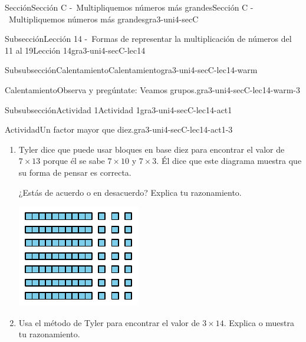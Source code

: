 \documentclass[twoside,10pt,]{article}
\begin{document}
\begin{sectionptx}{Sección}{Sección C -~Multipliquemos números más grandes}{}{Sección C -~Multipliquemos números más grandes}{}{}{gra3-uni4-secC}
\begin{subsectionptx}{Subsección}{Lección 14 -~Formas de representar la multiplicación de números del 11 al 19}{}{Lección 14}{}{}{gra3-uni4-secC-lec14}
\begin{subsubsectionptx}{Subsubsección}{Calentamiento}{}{Calentamiento}{}{}{gra3-uni4-secC-lec14-warm}
\begin{exploration}{Calentamiento}{Observa y pregúntate: Veamos grupos.}{gra3-uni4-secC-lec14-warm-3}
\begin{sidebyside}{3}{0}{0}{0}
\begin{sbspanel}{0.333333333333333}
\end{sbspanel}%
\end{sidebyside}%
\end{exploration}%
\end{subsubsectionptx}
%
%
\typeout{************************************************}
\typeout{************************************************}
%
\begin{subsubsectionptx}{Subsubsección}{Actividad 1}{}{Actividad 1}{}{}{gra3-uni4-secC-lec14-act1}
\begin{activity}{Actividad}{Un factor mayor que diez.}{gra3-uni4-secC-lec14-act1-3}%
%
\begin{enumerate}
\item{}\begin{sidebyside}{2}{0}{0}{0.05}%
\begin{sbspanel}{0.55}%
Tyler dice que puede usar bloques en base diez para encontrar el valor de \(7\times 13\) porque él se sabe \(7\times 10\) y \(7\times 3\). Él dice que este diagrama muestra que su forma de pensar es correcta.%
\par
¿Estás de acuerdo o en desacuerdo? Explica tu razonamiento.%
\end{sbspanel}%
\begin{sbspanel}{0.4}%
\includegraphics[width=\linewidth]{external/svg-source/tikz-file-141823.pdf}
\end{sbspanel}%
\end{sidebyside}%
%
\item{}Usa el método de Tyler para encontrar el valor de  \(3\times 14\). Explica o muestra tu razonamiento.%

\end{enumerate}
\end{activity}
\end{subsubsectionptx}
\end{subsectionptx}
\end{sectionptx}
\end{document}
